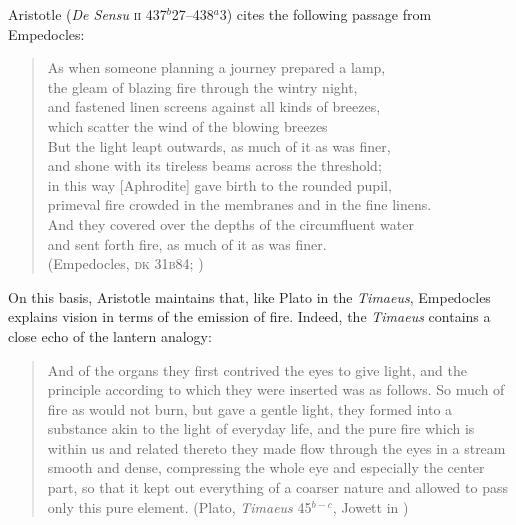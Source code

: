 Aristotle (\emph{De Sensu} \textsc{ii} 437\( ^{b} \)27--438\( ^{a} \)3) cites the following passage from Empedocles:
\begin{verse}
	As when someone planning a journey prepared a lamp,\\
	the gleam of blazing fire through the wintry night,\\
	and fastened linen screens against all kinds of breezes,\\
	which scatter the wind of the blowing breezes\\
	But the light leapt outwards, as much of it as was finer,\\
	and shone with its tireless beams across the threshold;\\
	in this way [Aphrodite] gave birth to the rounded pupil,\\
	primeval fire crowded in the membranes and in the fine linens.\\
	And they covered over the depths of the circumfluent water\\
	and sent forth fire, as much of it as was finer.\\
	(Empedocles, \textsc{dk} 31\textsc{b}84; \citealt[103 259]{Inwood:2001ve})
\end{verse}
On this basis, Aristotle maintains that, like Plato in the \emph{Timaeus}, Empedocles explains vision in terms of the emission of fire. Indeed, the \emph{Timaeus} contains a close echo of the lantern analogy: 
\begin{quote}
	And of the organs they first contrived the eyes to give light, and the principle according to which they were inserted was as follows. So much of fire as would not burn, but gave a gentle light, they formed into a substance akin to the light of everyday life, and the pure fire which is within us and related thereto they made flow through the eyes in a stream smooth and dense, compressing the whole eye and especially the center part, so that it kept out everything of a coarser nature and allowed to pass only this pure element. (Plato, \emph{Timaeus} 45\( ^{b-c} \), Jowett in \citealt{Hamilton:1989fk})
\end{quote}

